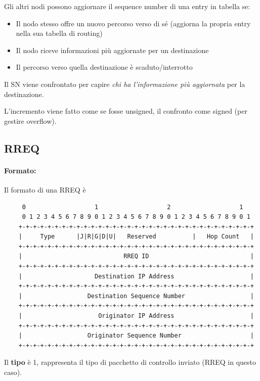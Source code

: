 Gli altri nodi possono aggiornare il sequence number di una entry in tabella se: 
\begin{itemize}
	\item Il nodo stesso offre un nuovo percorso verso di sé (aggiorna la propria entry nella sua tabella di routing)

	\item Il nodo riceve informazioni più aggiornate per un destinazione

	\item Il percorso verso quella destinazione è scaduto/interrotto
\end{itemize}

Il SN viene confrontato per capire \textit{chi ha l'informazione più aggiornata} per la destinazione. 

L'incremento viene fatto come se fosse unsigned, il confronto come signed (per gestire overflow).

\subsection{RREQ}

\paragraph{Formato:} Il formato di una RREQ è 
\begin{verbatim}
	 0                   1                   2                   1
	 0 1 2 3 4 5 6 7 8 9 0 1 2 3 4 5 6 7 8 9 0 1 2 3 4 5 6 7 8 9 0 1
	+-+-+-+-+-+-+-+-+-+-+-+-+-+-+-+-+-+-+-+-+-+-+-+-+-+-+-+-+-+-+-+-+
	|     Type      |J|R|G|D|U|   Reserved          |   Hop Count   |
	+-+-+-+-+-+-+-+-+-+-+-+-+-+-+-+-+-+-+-+-+-+-+-+-+-+-+-+-+-+-+-+-+
	|                            RREQ ID                            |
	+-+-+-+-+-+-+-+-+-+-+-+-+-+-+-+-+-+-+-+-+-+-+-+-+-+-+-+-+-+-+-+-+
	|                    Destination IP Address                     |
	+-+-+-+-+-+-+-+-+-+-+-+-+-+-+-+-+-+-+-+-+-+-+-+-+-+-+-+-+-+-+-+-+
	|                  Destination Sequence Number                  |
	+-+-+-+-+-+-+-+-+-+-+-+-+-+-+-+-+-+-+-+-+-+-+-+-+-+-+-+-+-+-+-+-+
	|                     Originator IP Address                     |
	+-+-+-+-+-+-+-+-+-+-+-+-+-+-+-+-+-+-+-+-+-+-+-+-+-+-+-+-+-+-+-+-+
	|                  Originator Sequence Number                   |
	+-+-+-+-+-+-+-+-+-+-+-+-+-+-+-+-+-+-+-+-+-+-+-+-+-+-+-+-+-+-+-+-+
\end{verbatim}

Il \textbf{tipo} è 1, rappresenta il tipo di pacchetto di controllo inviato (RREQ in questo caso).

